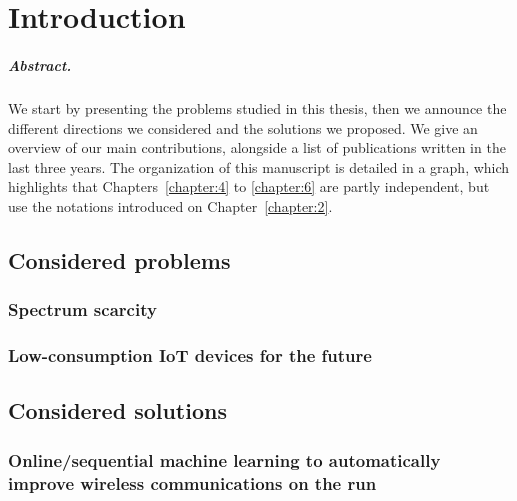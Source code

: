 
\chapter{Introduction}
\label{chapter:1}
\minitoc

\paragraph{Abstract.}
%
We start by presenting the problems studied in this thesis,
then we announce the different directions we considered and the solutions we proposed.
We give an overview of our main contributions, alongside a list of publications written in the last three years.
%
The organization of this manuscript is detailed in a graph, which highlights that Chapters~\ref{chapter:4} to \ref{chapter:6} are partly independent, but use the notations introduced on Chapter~\ref{chapter:2}.

\newpage
\graphicspath{{2-Chapters/1-Chapter/Images/}}

\section{Considered problems}
\label{sec:1:problems}


\subsection{Spectrum scarcity}


\subsection{Low-consumption IoT devices for the future}


\section{Considered solutions}
\label{sec:1:solutions}



\subsection{Online/sequential machine learning to automatically improve wireless communications on the run}


